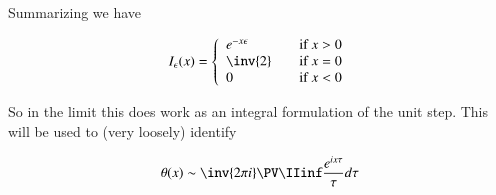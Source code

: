 Summarizing we have

\begin{align*}
I_\epsilon(x) =
\left\{
\begin{array}{l l}
e^{-x\epsilon} & \quad \mbox{if $x > 0$} \\
\inv{2} & \quad \mbox{if $x = 0$} \\
0 & \quad \mbox{if $x < 0$} \\
\end{array}
\right.
\end{align*}

So in the limit this does work as an integral formulation of the unit step.  This will be used to (very loosely) identify

\begin{align}\label{eqn:poisson:heavysideUnitIntegral}
\theta(x) \sim \inv{2\pi i} \PV \IIinf \frac{e^{ix\tau}}{\tau} d\tau
\end{align}
